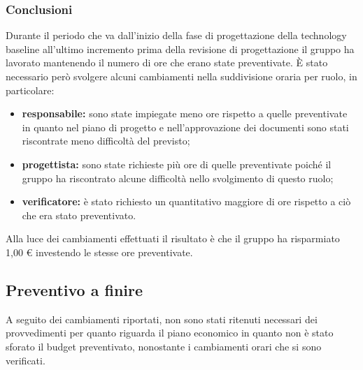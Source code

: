 		\subsubsection*{Conclusioni}
			Durante il periodo che va dall'inizio della fase di progettazione della technology baseline all'ultimo incremento prima della revisione di progettazione il gruppo ha lavorato mantenendo il numero di ore che erano state preventivate. È stato necessario però svolgere alcuni cambiamenti nella suddivisione oraria per ruolo, in particolare:
			\begin{itemize}
				\item \textbf{responsabile:} sono state impiegate meno ore rispetto a quelle preventivate in quanto nel piano di progetto e nell'approvazione dei documenti sono stati riscontrate meno difficoltà del previsto;
				\item \textbf{progettista:} sono state richieste più ore di quelle preventivate poiché il gruppo ha riscontrato alcune difficoltà nello svolgimento di questo ruolo;
				\item \textbf{verificatore:} è stato richiesto un quantitativo maggiore di ore rispetto a ciò che era stato preventivato.
			\end{itemize}
			Alla luce dei cambiamenti effettuati il risultato è che il gruppo ha risparmiato 1,00 € investendo le stesse ore preventivate.
		

		\subsection{Preventivo a finire}
			A seguito dei cambiamenti riportati, non sono stati ritenuti necessari dei provvedimenti per quanto riguarda il piano economico in quanto non è stato sforato il budget preventivato, nonostante i cambiamenti orari che si sono verificati.
			
			
			
			